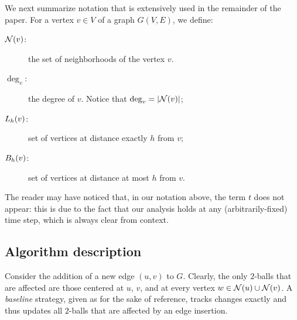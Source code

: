 We next summarize notation that is extensively used in the remainder of the paper. For a vertex $v \in V$ of a graph $G(V,E)$, we define:
    
    
    \begin{description} 
    \item[$\mathcal{N}(v)$:] the set of neighborhoods of the vertex $v$.
    \item[$\deg_v$:] the degree of $v$. Notice that $\deg_v = \vert \mathcal{N}(v) \vert$;
    \item[$L_h(v)$:] set of vertices at distance exactly $h$ from $v$;
    \item[$B_h(v)$:] set of vertices at distance at most $h$ from $v$. 
\end{description}

The reader may have noticed that, in our notation above, the term $t$ does not appear: this is due to the fact that our analysis holds at any (arbitrarily-fixed) time step, which  is always clear from context. 



 

\subsection{Algorithm description} \label{ssec:algos}

Consider the addition of a new edge $(u,v)$ to $G$. Clearly, the only $2$-balls that are affected are those centered at $u$, $v$, and at every vertex $w \in \mathcal{N}(u) \cup \mathcal{N}(v)$. A \emph{baseline} strategy, given as  for the sake of reference, tracks changes exactly and thus updates all $2$-balls that are affected by an edge insertion. 


